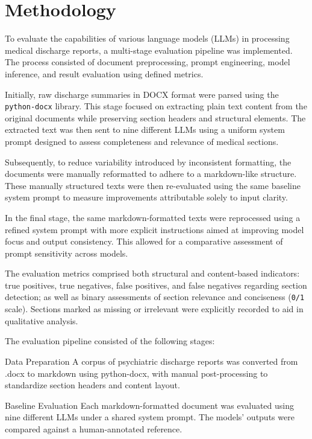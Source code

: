 \section{Methodology}

To evaluate the capabilities of various language models (LLMs) in 
processing medical discharge reports, a multi-stage evaluation pipeline 
was implemented. The process consisted of document preprocessing, 
prompt engineering, model inference, and result evaluation using defined metrics.

Initially, raw discharge summaries in DOCX format were parsed 
using the \texttt{python-docx} library. This stage focused on extracting 
plain text content from the original documents while preserving section 
headers and structural elements. The extracted text was then sent to nine 
different LLMs using a uniform system prompt designed to assess completeness and 
relevance of medical sections.

Subsequently, to reduce variability introduced by inconsistent formatting, 
the documents were manually reformatted to adhere to a markdown-like structure. 
These manually structured texts were then re-evaluated using the same baseline 
system prompt to measure improvements attributable solely to input clarity.

In the final stage, the same markdown-formatted texts were reprocessed using 
a refined system prompt with more explicit instructions aimed at improving model 
focus and output consistency. This allowed for a comparative assessment of 
prompt sensitivity across models.

The evaluation metrics comprised both structural and content-based indicators: 
true positives, true negatives, false positives, and false negatives regarding 
section detection; as well as binary assessments of section relevance and conciseness 
(\texttt{0/1} scale). Sections marked as missing or irrelevant were explicitly 
recorded to aid in qualitative analysis.

The evaluation pipeline consisted of the following stages:

    Data Preparation
    A corpus of psychiatric discharge reports was converted from .docx to markdown using python-docx, with manual post-processing to standardize section headers and content layout.

    Baseline Evaluation
    Each markdown-formatted document was evaluated using nine different LLMs under a shared system prompt. The models' outputs were compared against a human-annotated reference.

